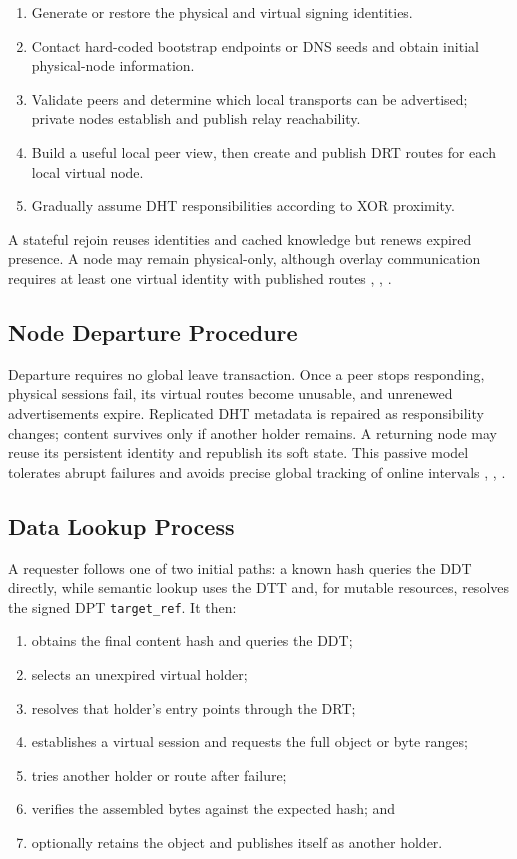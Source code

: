 \documentclass[
  12pt,
  oneside,
  a4paper,
  chapter=TITLE,
  section=TITLE,
  english,
  brazil
]{abntex2}
\begin{document}
\begin{enumerate}
    \item Generate or restore the physical and virtual signing identities.
    \item Contact hard-coded bootstrap endpoints or DNS seeds and obtain initial
    physical-node information.
    \item Validate peers and determine which local transports can be advertised;
    private nodes establish and publish relay reachability.
    \item Build a useful local peer view, then create and publish DRT routes for each
    local virtual node.
    \item Gradually assume DHT responsibilities according to XOR proximity.
\end{enumerate}

A stateful rejoin reuses identities and cached knowledge but renews expired presence.
A node may remain physical-only, although overlay communication requires at least one
virtual identity with published routes \cite{li2022unreachable}, \cite{augustine2022byzantine}, \cite{mirzaei2018pk}.

\subsection{Node Departure Procedure}

Departure requires no global leave transaction. Once a peer stops responding, physical
sessions fail, its virtual routes become unusable, and unrenewed advertisements expire.
Replicated DHT metadata is repaired as responsibility changes; content survives only
if another holder remains. A returning node may reuse its persistent identity and
republish its soft state. This passive model tolerates abrupt failures and avoids
precise global tracking of online intervals \cite{augustine2022byzantine}, \cite{mirzaei2018pk}, \cite{qian2016garlic}.

\subsection{Data Lookup Process}

A requester follows one of two initial paths: a known hash queries the DDT directly,
while semantic lookup uses the DTT and, for mutable resources, resolves the signed DPT
\texttt{target\_ref}. It then:

\begin{enumerate}
    \item obtains the final content hash and queries the DDT;
    \item selects an unexpired virtual holder;
    \item resolves that holder's entry points through the DRT;
    \item establishes a virtual session and requests the full object or byte ranges;
    \item tries another holder or route after failure;
    \item verifies the assembled bytes against the expected hash; and
    \item optionally retains the object and publishes itself as another holder.
\end{enumerate}
\end{document}
